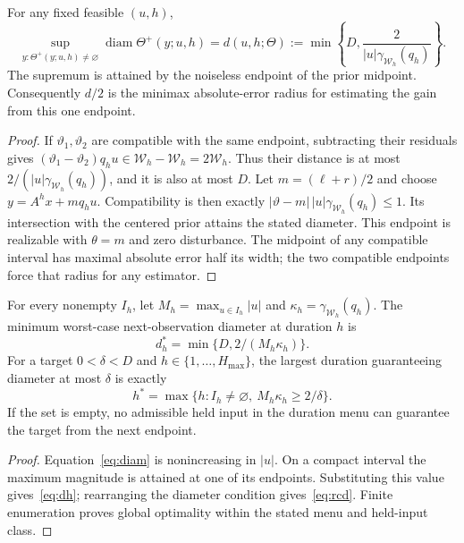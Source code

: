 \documentclass{l4dc2026}
\newcommand{\W}{\mathcal{W}}
\newcommand{\diam}{\operatorname{diam}}
\newcommand{\gauge}{\gamma}
\begin{document}
\begin{theorem}\label{thm:diam}
For any fixed feasible $(u,h)$,
\begin{equation}\label{eq:diam}
 \sup_{y:\Theta^+(y;u,h)\ne\varnothing}\diam\Theta^+(y;u,h)
 =d(u,h;\Theta):=\min\left\{D,\frac{2}{|u|\gauge_{\W_h}(q_h)}\right\}.
\end{equation}
The supremum is attained by the noiseless endpoint of the prior midpoint. Consequently $d/2$ is the minimax absolute-error radius for estimating the gain from this one endpoint.
\end{theorem}
\begin{proof}
If $\vartheta_1,\vartheta_2$ are compatible with the same endpoint, subtracting their residuals gives
$(\vartheta_1-\vartheta_2)q_hu\in\W_h-\W_h=2\W_h$.
Thus their distance is at most $2/(|u|\gauge_{\W_h}(q_h))$, and it is also at most $D$. Let $m=(\ell+r)/2$ and choose $y=A^hx+m q_hu$. Compatibility is then exactly
$|\vartheta-m|\,|u|\gauge_{\W_h}(q_h)\le1$.
Its intersection with the centered prior attains the stated diameter. This endpoint is realizable with $\theta=m$ and zero disturbance. The midpoint of any compatible interval has maximal absolute error half its width; the two compatible endpoints force that radius for any estimator.
\end{proof}



\begin{theorem}\label{thm:frontier}
For every nonempty $I_h$, let $M_h=\max_{u\in I_h}|u|$ and $\kappa_h=\gauge_{\W_h}(q_h)$. The minimum worst-case next-observation diameter at duration $h$ is
\begin{equation}\label{eq:dh}
 d_h^*=\min\{D,2/(M_h\kappa_h)\}.
\end{equation}
For a target $0<\delta<D$ and $h\in\{1,\ldots,H_{\max}\}$, the largest duration guaranteeing diameter at most $\delta$ is exactly
\begin{equation}\label{eq:rcd}
 h^*=\max\{h:I_h\ne\varnothing,\ M_h\kappa_h\ge2/\delta\}.
\end{equation}
If the set is empty, no admissible held input in the duration menu can guarantee the target from the next endpoint.
\end{theorem}
\begin{proof}
Equation~\eqref{eq:diam} is nonincreasing in $|u|$. On a compact interval the maximum magnitude is attained at one of its endpoints. Substituting this value gives~\eqref{eq:dh}; rearranging the diameter condition gives~\eqref{eq:rcd}. Finite enumeration proves global optimality within the stated menu and held-input class.
\end{proof}
\end{document}
